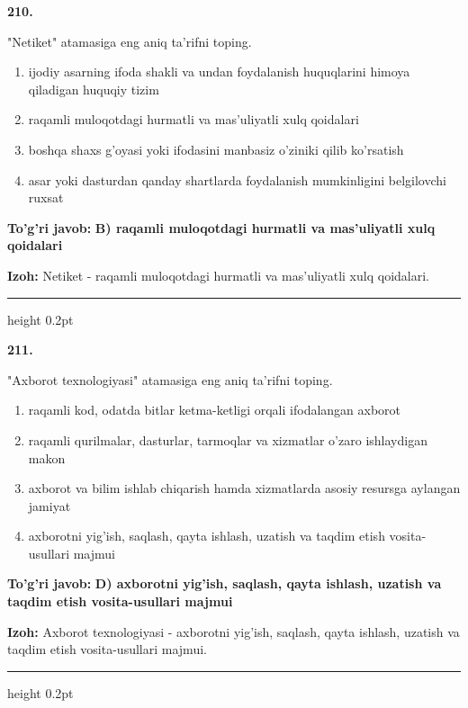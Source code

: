 \documentclass[10pt,a4paper,oneside]{article}
\begin{document}
\noindent\textbf{\color{ink}210.}
\par
"Netiket" atamasiga eng aniq ta'rifni toping.
\begin{enumerate}[label=\Alph*),leftmargin=9mm]
\item ijodiy asarning ifoda shakli va undan foydalanish huquqlarini himoya qiladigan huquqiy tizim
\item raqamli muloqotdagi hurmatli va mas'uliyatli xulq qoidalari
\item boshqa shaxs g'oyasi yoki ifodasini manbasiz o'ziniki qilib ko'rsatish
\item asar yoki dasturdan qanday shartlarda foydalanish mumkinligini belgilovchi ruxsat
\end{enumerate}
\begin{tcolorbox}[enhanced,breakable,colback=teal!4,colframe=teal!50!black,boxrule=0.5pt,arc=1.1mm,left=3mm,right=3mm,top=1.7mm,bottom=1.7mm,before skip=2mm,after skip=2mm]
\textbf{\color{teal}To'g'ri javob:} \textbf{B) raqamli muloqotdagi hurmatli va mas'uliyatli xulq qoidalari}
\par\smallskip
\textbf{Izoh:} Netiket - raqamli muloqotdagi hurmatli va mas'uliyatli xulq qoidalari.
\end{tcolorbox}
\vspace{2mm}\hrule height 0.2pt \vspace{3mm}

\noindent\textbf{\color{ink}211.}
\par
"Axborot texnologiyasi" atamasiga eng aniq ta'rifni toping.
\begin{enumerate}[label=\Alph*),leftmargin=9mm]
\item raqamli kod, odatda bitlar ketma-ketligi orqali ifodalangan axborot
\item raqamli qurilmalar, dasturlar, tarmoqlar va xizmatlar o'zaro ishlaydigan makon
\item axborot va bilim ishlab chiqarish hamda xizmatlarda asosiy resursga aylangan jamiyat
\item axborotni yig'ish, saqlash, qayta ishlash, uzatish va taqdim etish vosita-usullari majmui
\end{enumerate}
\begin{tcolorbox}[enhanced,breakable,colback=teal!4,colframe=teal!50!black,boxrule=0.5pt,arc=1.1mm,left=3mm,right=3mm,top=1.7mm,bottom=1.7mm,before skip=2mm,after skip=2mm]
\textbf{\color{teal}To'g'ri javob:} \textbf{D) axborotni yig'ish, saqlash, qayta ishlash, uzatish va taqdim etish vosita-usullari majmui}
\par\smallskip
\textbf{Izoh:} Axborot texnologiyasi - axborotni yig'ish, saqlash, qayta ishlash, uzatish va taqdim etish vosita-usullari majmui.
\end{tcolorbox}
\vspace{2mm}\hrule height 0.2pt \vspace{3mm}
\end{document}
